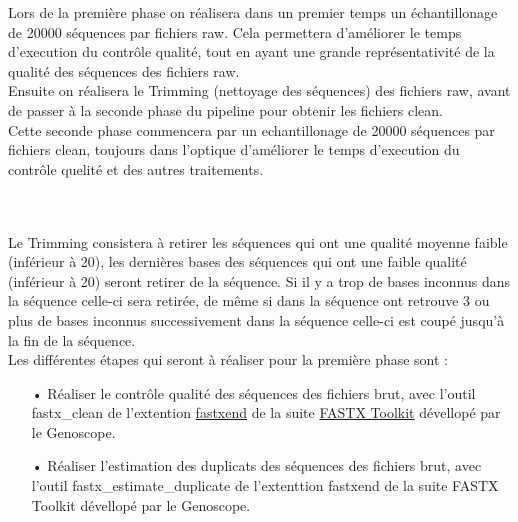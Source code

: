 \begin{minipage}{0.45\textwidth}

    Lors de la première phase on réalisera dans un premier temps un échantillonage de 20000 séquences par fichiers \og raw\fg{}. Cela permettera d'améliorer le temps d'execution du contrôle qualité, tout en ayant une grande représentativité de la qualité des séquences des fichiers \og raw\fg{}.\\

    Ensuite on réalisera le \og Trimming\fg{} (nettoyage des séquences) des fichiers \og raw\fg{}, avant de passer à la seconde phase du pipeline pour obtenir les fichiers \og clean\fg{}.\\

    Cette seconde phase commencera par un echantillonage de 20000 séquences par fichiers \og clean\fg{}, toujours dans l'optique d'améliorer le temps d'execution du contrôle quelité et des autres traitements.


\end{minipage}\\\\

Le Trimming consistera à retirer les séquences qui ont une qualité moyenne faible (inférieur à 20), les dernières bases des séquences qui ont une faible qualité (inférieur à 20) seront retirer de la séquence. Si il y a trop de bases inconnus dans la séquence celle-ci sera retirée, de même si dans la séquence ont retrouve 3 ou plus de bases inconnus successivement dans la séquence celle-ci est coupé jusqu'à la fin de la séquence.\\


Les différentes étapes qui seront à réaliser pour la première phase sont :\\
\begin{itemize}
    \item[•] Réaliser le contrôle qualité des séquences des fichiers brut, avec l'outil fastx\_clean de l'extention \href{https://github.com/institut-de-genomique/fastxtend}{fastxend} de la suite \href{http://hannonlab.cshl.edu/fastx_toolkit/}{FASTX Toolkit} dévellopé par le Genoscope.
    \item[•] Réaliser l'estimation des duplicats des séquences des fichiers brut, avec l'outil fastx\_estimate\_duplicate de l'extenttion fastxend de la suite FASTX Toolkit dévellopé par le Genoscope.\\
\end{itemize}

